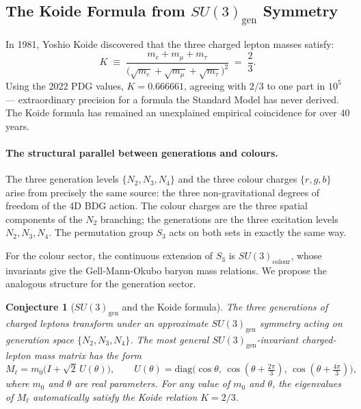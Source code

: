 \documentclass[11pt,a4paper]{article}
\newtheorem{conjecture}[theorem]{Conjecture}
\begin{document}
\subsection{The Koide Formula from $SU(3)_{\mathrm{gen}}$ Symmetry}
\label{sec:koide}

In 1981, Yoshio Koide discovered that the three charged lepton masses satisfy:
\begin{equation}
  K \;\equiv\; \frac{m_e + m_\mu + m_\tau}{\bigl(\sqrt{m_e} + \sqrt{m_\mu}
  + \sqrt{m_\tau}\bigr)^2} \;=\; \frac{2}{3}.
  \label{eq:koide}
\end{equation}
Using the 2022 PDG values, $K = 0.666661$, agreeing with $2/3$ to one part
in $10^5$ --- extraordinary precision for a formula the Standard Model has
never derived. The Koide formula has remained an unexplained empirical
coincidence for over 40 years.

\paragraph{The structural parallel between generations and colours.}
The three generation levels $\{N_2, N_3, N_4\}$ and the three colour charges
$\{r, g, b\}$ arise from precisely the same source: the three non-gravitational
degrees of freedom of the 4D BDG action. The colour charges are the three
spatial components of the $N_2$ branching; the generations are the three
excitation levels $N_2, N_3, N_4$. The permutation group $S_3$ acts
on both sets in exactly the same way.

For the colour sector, the continuous extension of $S_3$ is $SU(3)_{\mathrm{colour}}$,
whose invariants give the Gell-Mann-Okubo baryon mass relations. We propose
the analogous structure for the generation sector.

\begin{conjecture}[$SU(3)_{\mathrm{gen}}$ and the Koide formula]
\label{conj:koide}
The three generations of charged leptons transform under an approximate
$SU(3)_{\mathrm{gen}}$ symmetry acting on generation space $\{N_2, N_3, N_4\}$.
The most general $SU(3)_{\mathrm{gen}}$-invariant charged-lepton mass matrix
has the form
\begin{equation}
  M_\ell = m_0\bigl(I + \sqrt{2}\,U(\theta)\bigr),
  \qquad
  U(\theta) = \mathrm{diag}\bigl(\cos\theta,\,
  \cos(\theta+\tfrac{2\pi}{3}),\, \cos(\theta+\tfrac{4\pi}{3})\bigr),
  \label{eq:koide_mass_matrix}
\end{equation}
where $m_0$ and $\theta$ are real parameters. For any value of $m_0$ and
$\theta$, the eigenvalues of $M_\ell$ automatically satisfy the Koide relation
$K = 2/3$.
\end{conjecture}
\end{document}
